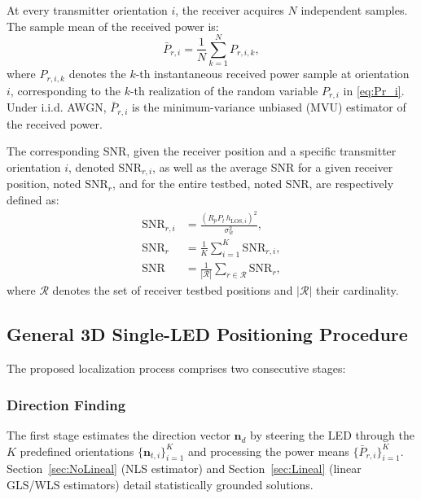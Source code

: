 \documentclass[journal]{IEEEtran}
\begin{document}
At every transmitter orientation \(i\), the receiver acquires \(N\) independent samples. The sample mean of the received power is:
\begin{equation}
\bar P_{r,i}=\frac{1}{N}\sum_{k=1}^{N} P_{r,i,k},
\label{eq:sampleMean}
\end{equation}
where \(P_{r,i,k}\) denotes the \(k\)-th instantaneous received power sample at orientation \(i\), corresponding to the \(k\)-th realization of the random variable \(P_{r,i}\) in \eqref{eq:Pr_i}. Under i.i.d. AWGN, \(\bar P_{r,i}\) is the minimum-variance unbiased (MVU) estimator of the received power.

The corresponding SNR, given the receiver position and a specific transmitter orientation \(i\), denoted $\mathrm{SNR}_{r,i}$, as well as the average SNR for a given receiver position, noted $\mathrm{SNR}_{r}$, and for the entire testbed, noted $\mathrm{SNR}$, are respectively defined as:
\begin{subequations}\label{eq:SNR}
\begin{align}
\mathrm{SNR}_{r,i} &= \frac{(R_pP_{t}\,h_{\text{LOS},i})^2}{\sigma_{w}^{2}}, \label{eq:SNRa} \\
\mathrm{SNR}_{r} &= \frac{1}{K}\sum_{i=1}^{K}\mathrm{SNR}_{r,i}, \label{eq:SNRb} \\
\mathrm{SNR} &= \frac{1}{|\mathcal{R}|}\sum_{r\in\mathcal{R}}{\mathrm{SNR}}_{r}, \label{eq:SNRc}
\end{align}
\end{subequations}
where \(\mathcal{R}\) denotes the set of receiver testbed positions and $|\mathcal R|$ their cardinality. 


\subsection{General 3D Single-LED Positioning Procedure}

The proposed localization process comprises two consecutive stages:

\subsubsection{Direction Finding}

The first stage estimates the direction vector \(\mathbf{n}_{d}\) by steering the LED through the \(K\) predefined orientations \(\{\mathbf{n}_{t,i}\}_{i=1}^{K}\) and processing the power means \(\{\bar P_{r,i}\}_{i=1}^{K}\). Section~\ref{sec:NoLineal} (NLS estimator) and Section~\ref{sec:Lineal} (linear GLS/WLS estimators) detail statistically grounded solutions.
\end{document}
